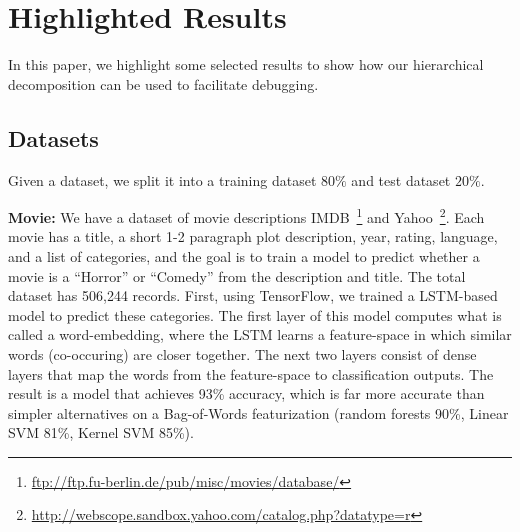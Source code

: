 \section{Highlighted Results}
In this paper, we highlight some selected results to show how our hierarchical decomposition can be used to facilitate debugging. 

\subsection{Datasets}
Given a dataset, we split it into a training dataset $80\%$ and test dataset $20\%$. 

 \vspace{0.5em} \noindent \textbf{Movie: } We have a dataset of movie descriptions IMDB~\footnote{ \url{ftp://ftp.fu-berlin.de/pub/misc/movies/database/}} and Yahoo~\footnote{ \url{http://webscope.sandbox.yahoo.com/catalog.php?datatype=r}}.
Each movie has a title, a short 1-2 paragraph plot description, year, rating, language, and a list of categories, and the goal is to train a model to predict whether a movie is a ``Horror'' or ``Comedy'' from the description and title.  
The total dataset has 506,244 records.
First, using TensorFlow, we trained a LSTM-based model to predict these categories. The first layer of this model computes what is called a word-embedding, where the LSTM learns a feature-space in which similar words (co-occuring) are closer together. 
The next two layers consist of dense layers that map the words from the feature-space to classification outputs.
The result is a model that achieves 93\% accuracy, which is far more accurate than simpler alternatives on a Bag-of-Words featurization (random forests 90\%, Linear SVM 81\%, Kernel SVM 85\%).

